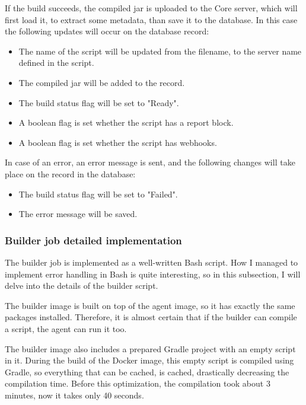 If the build succeeds, the compiled jar is uploaded to the Core server, which will first load it, to extract some metadata, than save it to the database. In this case the following updates will occur on the database record:

\begin{minipage}{\linewidth}
\begin{itemize}
    \item The name of the script will be updated from the filename, to the server name defined in the script.
    \item The compiled jar will be added to the record.
    \item The build status flag will be set to "Ready".
    \item A boolean flag is set whether the script has a report block.
    \item A boolean flag is set whether the script has webhooks.
\end{itemize}
\end{minipage}

In case of an error, an error message is sent, and the following changes will take place on the record in the database:

\begin{minipage}{\linewidth}
\begin{itemize}
    \item The build status flag will be set to "Failed".
    \item The error message will be saved.
\end{itemize}
\end{minipage}

\subsubsection{Builder job detailed implementation}

The builder job is implemented as a well-written Bash script. How I managed to implement error handling in Bash is quite interesting, so in this subsection, I will delve into the details of the builder script.

The builder image is built on top of the agent image, so it has exactly the same packages installed. Therefore, it is almost certain that if the builder can compile a script, the agent can run it too.

The builder image also includes a prepared Gradle project with an empty script in it. During the build of the Docker image, this empty script is compiled using Gradle, so everything that can be cached, is cached, drastically decreasing the compilation time. Before this optimization, the compilation took about 3 minutes, now it takes only 40 seconds.

